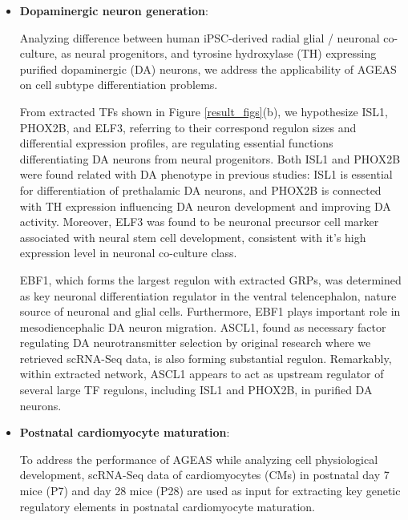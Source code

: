 \documentclass[fleqn,10pt]{wlscirep}
\begin{document}
  \begin{itemize}
    \setlength\itemsep{0em}
    \item {\textbf{Dopaminergic neuron generation}}:

      Analyzing difference between human iPSC-derived radial glial / neuronal co-culture, as neural progenitors,\cite{ASCL1_dopaminergic_neuron_2021} and tyrosine hydroxylase (TH) expressing purified dopaminergic (DA) neurons, we address the applicability of AGEAS on cell subtype differentiation problems.

      From extracted TFs shown in Figure \ref{result_figs}(b), we hypothesize ISL1, PHOX2B, and ELF3, referring to their correspond regulon sizes and differential expression profiles, are regulating essential functions differentiating DA neurons from neural progenitors.
      Both ISL1 and PHOX2B were found related with DA phenotype in previous studies:
      ISL1 is essential for differentiation of prethalamic DA neurons,\cite{isl1_da}
      and PHOX2B is connected with TH expression influencing DA neuron development and improving DA activity. \cite{phox2_caudal_da, phox2_rat_da}
      Moreover, ELF3 was found to be neuronal precursor cell marker associated with neural stem cell development, \cite{ELF3_precursor_marker} consistent with it's high expression level in neuronal co-culture class.

      EBF1, which forms the largest regulon with extracted GRPs, was determined as key neuronal differentiation regulator in the ventral telencephalon, nature source of neuronal and glial cells. \cite{ebf1_striatum, ebf1_cell_diff}
      Furthermore, EBF1 plays important role in mesodiencephalic DA neuron migration. \cite{ebf1_migration}
      ASCL1, found as necessary factor regulating DA neurotransmitter selection by original research where we retrieved scRNA-Seq data,\cite{ASCL1_dopaminergic_neuron_2021} is also forming substantial regulon.
      Remarkably, within extracted network, ASCL1 appears to act as upstream regulator of several large TF regulons, including ISL1 and PHOX2B, in purified DA neurons.

    \item {\textbf{Postnatal cardiomyocyte maturation}}:

      To address the performance of AGEAS while analyzing cell physiological development, scRNA-Seq data of cardiomyocytes (CMs) in postnatal day 7 mice (P7) and day 28 mice (P28) are used as input for extracting key genetic regulatory elements in postnatal cardiomyocyte maturation.


\end{itemize}
\end{document}
